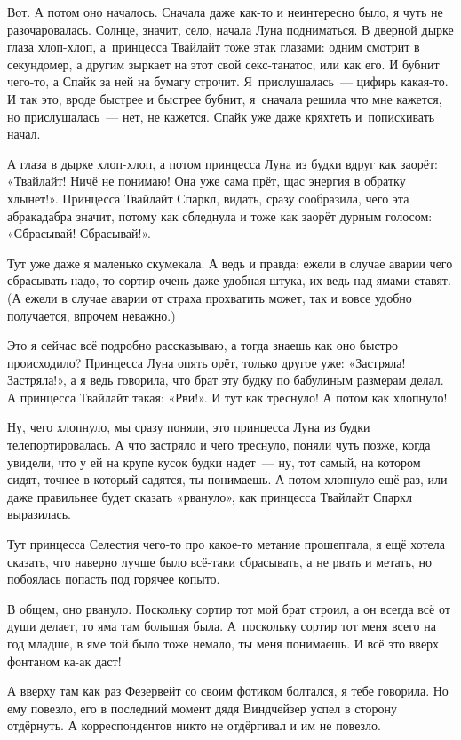 \documentclass[fontsize=11pt,a5paper,titlepage=firstcover]{scrbook}
\begin{document}
Вот. А потом оно началось. Сначала даже как-то и неинтересно было, я чуть не разочаровалась. Солнце, значит, село, начала Луна подниматься. В дверной дырке глаза хлоп-хлоп, а~принцесса Твайлайт тоже этак глазами: одним смотрит в секундомер, а другим зыркает на этот свой секс-танатос, или как его. И бубнит чего-то, а Спайк за ней на бумагу строчит. Я~прислушалась~--- цифирь какая-то. И так это, вроде быстрее и быстрее бубнит, я~сначала решила что мне кажется, но прислушалась~--- нет, не кажется. Спайк уже даже кряхтеть и~попискивать начал.

А глаза в дырке хлоп-хлоп, а потом принцесса Луна из будки вдруг как заорёт: «Твайлайт! Ничё не понимаю! Она уже сама прёт, щас энергия в обратку хлынет!». Принцесса Твайлайт Спаркл, видать, сразу сообразила, чего эта абракадабра значит, потому как сбледнула и тоже как заорёт дурным голосом: «Сбрасывай! Сбрасывай!».

Тут уже даже я маленько скумекала. А ведь и правда: ежели в случае аварии чего сбрасывать надо, то сортир очень даже удобная штука, их ведь над ямами ставят. (А ежели в случае аварии от страха прохватить может, так и вовсе удобно получается, впрочем неважно.)

Это я сейчас всё подробно рассказываю, а тогда знаешь как оно быстро происходило? Принцесса Луна опять орёт, только другое уже: «Застряла! Застряла!», а я ведь говорила, что брат эту будку по бабулиным размерам делал. А принцесса Твайлайт такая: «Рви!». И тут как треснуло! А потом как хлопнуло!

Ну, чего хлопнуло, мы сразу поняли, это принцесса Луна из будки телепортировалась. А что застряло и чего треснуло, поняли чуть позже, когда увидели, что у ей на крупе кусок будки надет~--- ну, тот самый, на котором сидят, точнее в который садятся, ты понимаешь. А потом хлопнуло ещё раз, или даже правильнее будет сказать «рвануло», как принцесса Твайлайт Спаркл выразилась.

Тут принцесса Селестия чего-то про какое-то метание прошептала, я ещё хотела сказать, что наверно лучше было всё-таки сбрасывать, а не рвать и метать, но побоялась попасть под горячее копыто.

В общем, оно рвануло. Поскольку сортир тот мой брат строил, а он всегда всё от души делает, то яма там большая была. А~поскольку сортир тот меня всего на год младше, в яме той было тоже немало, ты меня понимаешь. И всё это вверх фонтаном ка-ак даст!

А вверху там как раз Фезервейт со своим фотиком болтался, я тебе говорила. Но ему повезло, его в последний момент дядя Виндчейзер успел в сторону отдёрнуть. А корреспондентов никто не отдёргивал и им не повезло.
\end{document}
